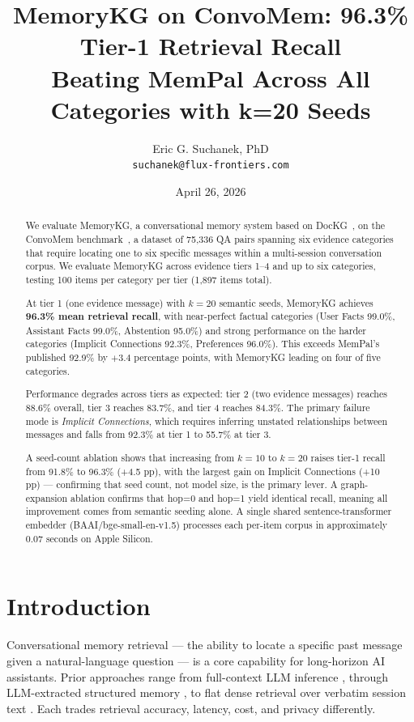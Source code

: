 \documentclass[11pt,a4paper]{article}
\title{\textbf{MemoryKG on ConvoMem: 96.3\% Tier-1 Retrieval Recall}\\
       \large Beating MemPal Across All Categories with k=20 Seeds}
\author{Eric G. Suchanek, PhD\\
        \texttt{suchanek@flux-frontiers.com}}
\date{April 26, 2026}
\begin{document}
\maketitle

\begin{abstract}
We evaluate MemoryKG, a conversational memory system based on
DocKG~\citep{dockg2026}, on the ConvoMem
benchmark~\citep{pakhomov2025convomem}, a dataset of 75,336 QA pairs spanning six
evidence categories that require locating one to six specific messages within a
multi-session conversation corpus.
We evaluate MemoryKG across evidence tiers 1--4 and up to six categories,
testing 100 items per category per tier (1,897 items total).

At tier 1 (one evidence message) with $k{=}20$ semantic seeds, MemoryKG achieves
\textbf{96.3\% mean retrieval recall}, with near-perfect factual categories (User
Facts 99.0\%, Assistant Facts 99.0\%, Abstention 95.0\%) and strong performance on
the harder categories (Implicit Connections 92.3\%, Preferences 96.0\%).
This exceeds MemPal's published 92.9\% by $+3.4$ percentage points, with MemoryKG
leading on four of five categories.

Performance degrades across tiers as expected:
tier 2 (two evidence messages) reaches 88.6\% overall, tier 3 reaches 83.7\%,
and tier 4 reaches 84.3\%.
The primary failure mode is \textit{Implicit Connections}, which requires
inferring unstated relationships between messages and falls from 92.3\% at
tier 1 to 55.7\% at tier 3.

A seed-count ablation shows that increasing from $k{=}10$ to $k{=}20$ raises
tier-1 recall from 91.8\% to 96.3\% (+4.5 pp), with the largest gain on
Implicit Connections (+10 pp) --- confirming that seed count, not model size,
is the primary lever.
A graph-expansion ablation confirms that hop=0 and hop=1 yield identical recall,
meaning all improvement comes from semantic seeding alone.
A single shared sentence-transformer embedder (BAAI/bge-small-en-v1.5) processes
each per-item corpus in approximately 0.07 seconds on Apple Silicon.
\end{abstract}

\section{Introduction}
\label{sec:intro}

Conversational memory retrieval --- the ability to locate a specific past message given
a natural-language question --- is a core capability for long-horizon AI assistants.
Prior approaches range from full-context LLM inference \citep{pakhomov2025convomem},
through LLM-extracted structured memory \citep{mem0}, to flat dense retrieval over
verbatim session text \citep{mempal2026}.
Each trades retrieval accuracy, latency, cost, and privacy differently.
\end{document}
